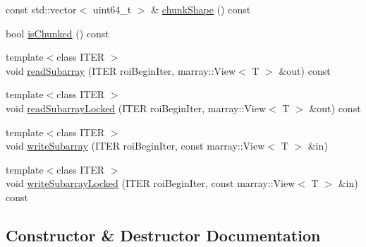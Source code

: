 \begin{DoxyCompactItemize}
const std\+::vector$<$ uint64\+\_\+t $>$ \& \hyperlink{classnifty_1_1hdf5_1_1Hdf5Array_a5e0e489414e1bef413cdf6f9b33aae66}{chunk\+Shape} () const 
\item 
bool \hyperlink{classnifty_1_1hdf5_1_1Hdf5Array_a4f528ec226501c76d88d66933e5bed81}{is\+Chunked} () const 
\item 
{\footnotesize template$<$class I\+T\+E\+R $>$ }\\void \hyperlink{classnifty_1_1hdf5_1_1Hdf5Array_a09f2804eb2d92a53c3123df6f4970414}{read\+Subarray} (I\+T\+E\+R roi\+Begin\+Iter, marray\+::\+View$<$ T $>$ \&out) const 
\item 
{\footnotesize template$<$class I\+T\+E\+R $>$ }\\void \hyperlink{classnifty_1_1hdf5_1_1Hdf5Array_a098888418cf243be746971ebdbb06754}{read\+Subarray\+Locked} (I\+T\+E\+R roi\+Begin\+Iter, marray\+::\+View$<$ T $>$ \&out) const 
\item 
{\footnotesize template$<$class I\+T\+E\+R $>$ }\\void \hyperlink{classnifty_1_1hdf5_1_1Hdf5Array_af6773c766d8f098f715e74de486df0af}{write\+Subarray} (I\+T\+E\+R roi\+Begin\+Iter, const marray\+::\+View$<$ T $>$ \&in)
\item 
{\footnotesize template$<$class I\+T\+E\+R $>$ }\\void \hyperlink{classnifty_1_1hdf5_1_1Hdf5Array_aaa52559f3b3baf61a0e3f4fed81dbb9c}{write\+Subarray\+Locked} (I\+T\+E\+R roi\+Begin\+Iter, const marray\+::\+View$<$ T $>$ \&in) const 
\end{DoxyCompactItemize}


\subsection{Constructor \& Destructor Documentation}
\hypertarget{classnifty_1_1hdf5_1_1Hdf5Array_af164b10a52ab55e3f5a72004b6f6e278}{}
